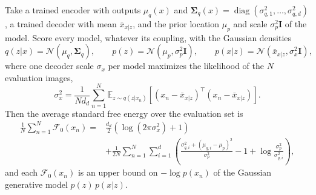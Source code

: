 \documentclass[twoside,11pt]{article}
\begin{document}
\begin{lemma}
\label{lemma:common_gaussian_evaluation}
Take a trained encoder with outputs $\mu_q(x)$ and $\boldsymbol{\Sigma}_q(x)=\operatorname{diag}(\sigma_{q,1}^2,\dots,\sigma_{q,d}^2)$, a trained decoder with mean $\bar{x}_{x|z}$, and the prior location $\mu_p$ and scale $\sigma_p^2\mathbf{I}$ of the model. Score every model, whatever its coupling, with the Gaussian densities
\begin{equation}
q(z|x)=\mathcal{N}\left(\mu_q,\boldsymbol{\Sigma}_q\right),\qquad p(z)=\mathcal{N}\left(\mu_p,\sigma_p^2\mathbf{I}\right),\qquad p(x|z)=\mathcal{N}\left(\bar{x}_{x|z},\sigma_x^2\mathbf{I}\right),
\end{equation}
where one decoder scale $\sigma_x$ per model maximizes the likelihood of the $N$ evaluation images,
\begin{equation}
\label{eq:common_gauss_sigma}
\sigma_x^2=\frac{1}{N d_d}\sum_{n=1}^{N}\mathbb{E}_{z\sim q(z|x_n)}\left[\left(x_n-\bar{x}_{x|z}\right)^{\intercal}\left(x_n-\bar{x}_{x|z}\right)\right].
\end{equation}
Then the average standard free energy over the evaluation set is
\begin{equation}
\label{eq:common_gauss_F0}
\begin{aligned}
\frac{1}{N}\sum_{n=1}^{N}\mathcal{F}_0(x_n)={}&\frac{d_d}{2}\left(\log\left(2\pi\sigma_x^2\right)+1\right)\\
&+\frac{1}{2N}\sum_{n=1}^{N}\sum_{i=1}^{d}\left(\frac{\sigma_{q,i}^2+\left(\mu_{q,i}-\mu_p\right)^2}{\sigma_p^2}-1+\log\frac{\sigma_p^2}{\sigma_{q,i}^2}\right),
\end{aligned}
\end{equation}
and each $\mathcal{F}_0(x_n)$ is an upper bound on $-\log p(x_n)$ of the Gaussian generative model $p(z)\,p(x|z)$.
\end{lemma}
\end{document}
